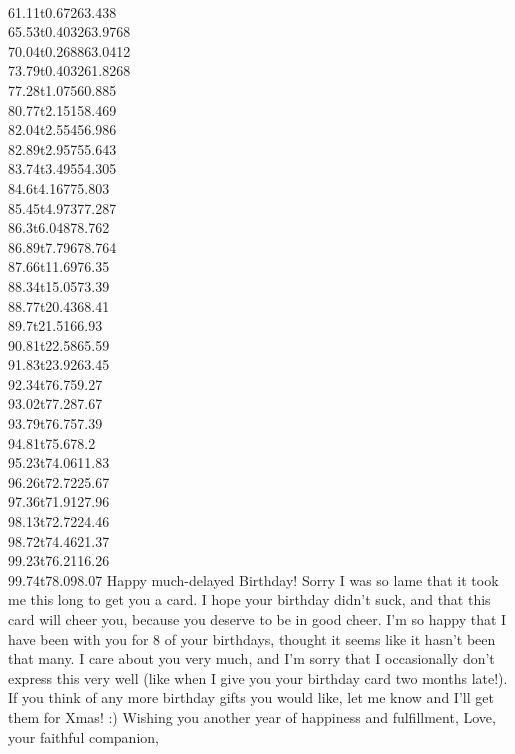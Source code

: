 \documentclass{report}
\begin{document}
{    \\{61.11}t{0.672}{63.438}
    \\{65.53}t{0.4032}{63.9768}
    \\{70.04}t{0.2688}{63.0412}
    \\{73.79}t{0.4032}{61.8268}
    \\{77.28}t{1.075}{60.885}
    \\{80.77}t{2.151}{58.469}
    \\{82.04}t{2.554}{56.986}
    \\{82.89}t{2.957}{55.643}
    \\{83.74}t{3.495}{54.305}
    \\{84.6}t{4.167}{75.803}%
    \\{85.45}t{4.973}{77.287}
    \\{86.3}t{6.048}{78.762}
    \\{86.89}t{7.796}{78.764}
    \\{87.66}t{11.69}{76.35}
    \\{88.34}t{15.05}{73.39}
    \\{88.77}t{20.43}{68.41}
    \\{89.7}t{21.51}{66.93}
    \\{90.81}t{22.58}{65.59}
    \\{91.83}t{23.92}{63.45}
    \\{92.34}t{76.75}{9.27}%
    \\{93.02}t{77.28}{7.67}
    \\{93.79}t{76.75}{7.39}
    \\{94.81}t{75.67}{8.2}
    \\{95.23}t{74.06}{11.83}
    \\{96.26}t{72.72}{25.67}
    \\{97.36}t{71.91}{27.96}
    \\{98.13}t{72.72}{24.46}
    \\{98.72}t{74.46}{21.37}
    \\{99.23}t{76.21}{16.26}
    \\{99.74}t{78.09}{8.07}
    }
    Happy much-delayed Birthday! Sorry I was so lame that it took me this long
    to get you a card. I hope your birthday didn't suck, and that
    this card will cheer you, because you deserve to be in good cheer. I'm
    so happy that I have been with you for 8 of your birthdays, thought it
    seems like it hasn't been that many. I care about you very much, and I'm
    sorry that I occasionally don't express this very well (like when I
    give you your birthday card two months late!). If you think of any
    more birthday gifts you would like, let me know and I'll get them for
    Xmas! :) Wishing you another year of happiness and fulfillment, Love,
    your faithful companion,   
\end{document}
